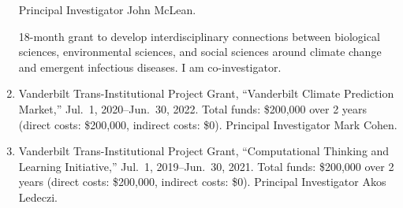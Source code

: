 \begin{enumerate}
    Principal Investigator John McLean.
\begin{credit}
18-month grant to develop interdisciplinary connections between biological sciences, environmental sciences, and social sciences around climate change and emergent infectious diseases.
I am co-investigator.
\end{credit}
    \item Vanderbilt Trans-Institutional Project Grant,
    ``Vanderbilt Climate Prediction Market,''
    Jul.~1, 2020--Jun.~30, 2022.
    Total funds: \$200,000 over 2 years (direct costs: \$200,000, indirect costs: \$0).
    Principal Investigator Mark Cohen.
    \item Vanderbilt Trans-Institutional Project Grant,
    ``Computational Thinking and Learning Initiative,''
    Jul.~1, 2019--Jun.~30, 2021.
    Total funds: \$200,000 over 2 years (direct costs: \$200,000, indirect costs: \$0).
    Principal Investigator Akos Ledeczi.
\end{enumerate}
%
\iffalse
\subsubsection{Pending Grant Proposals}
\begin{enumerate}
\end{enumerate}
\fi
%
